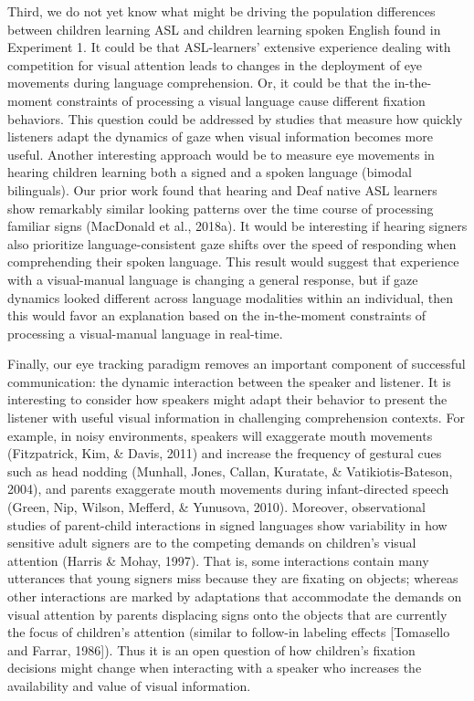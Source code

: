 \documentclass[,man,floatsintext]{apa6}
\begin{document}
Third, we do not yet know what might be driving the population differences between children learning ASL and children learning spoken English found in Experiment 1. It could be that ASL-learners' extensive experience dealing with competition for visual attention leads to changes in the deployment of eye movements during language comprehension. Or, it could be that the in-the-moment constraints of processing a visual language cause different fixation behaviors. This question could be addressed by studies that measure how quickly listeners adapt the dynamics of gaze when visual information becomes more useful. Another interesting approach would be to measure eye movements in hearing children learning both a signed and a spoken language (bimodal bilinguals). Our prior work found that hearing and Deaf native ASL learners show remarkably similar looking patterns over the time course of processing familiar signs (MacDonald et al., 2018a). It would be interesting if hearing signers also prioritize language-consistent gaze shifts over the speed of responding when comprehending their spoken language. This result would suggest that experience with a visual-manual language is changing a general response, but if gaze dynamics looked different across language modalities within an individual, then this would favor an explanation based on the in-the-moment constraints of processing a visual-manual language in real-time.

Finally, our eye tracking paradigm removes an important component of successful communication: the dynamic interaction between the speaker and listener. It is interesting to consider how speakers might adapt their behavior to present the listener with useful visual information in challenging comprehension contexts. For example, in noisy environments, speakers will exaggerate mouth movements (Fitzpatrick, Kim, \& Davis, 2011) and increase the frequency of gestural cues such as head nodding (Munhall, Jones, Callan, Kuratate, \& Vatikiotis-Bateson, 2004), and parents exaggerate mouth movements during infant-directed speech (Green, Nip, Wilson, Mefferd, \& Yunusova, 2010). Moreover, observational studies of parent-child interactions in signed languages show variability in how sensitive adult signers are to the competing demands on children's visual attention (Harris \& Mohay, 1997). That is, some interactions contain many utterances that young signers miss because they are fixating on objects; whereas other interactions are marked by adaptations that accommodate the demands on visual attention by parents displacing signs onto the objects that are currently the focus of children's attention (similar to follow-in labeling effects {[}Tomasello and Farrar, 1986{]}). Thus it is an open question of how children's fixation decisions might change when interacting with a speaker who increases the availability and value of visual information.
\end{document}
